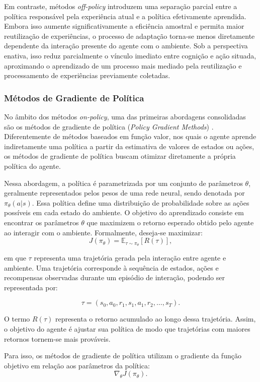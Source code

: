 Em contraste, métodos \textit{off-policy} introduzem uma separação parcial entre a política responsável pela experiência atual e a política efetivamente aprendida. Embora isso aumente significativamente a eficiência amostral e permita maior reutilização de experiências, o processo de adaptação torna-se menos diretamente dependente da interação presente do agente com o ambiente. Sob a perspectiva enativa, isso reduz parcialmente o vínculo imediato entre cognição e ação situada, aproximando o aprendizado de um processo mais mediado pela reutilização e processamento de experiências previamente coletadas.


\subsubsection{Métodos de Gradiente de Política}

No âmbito dos métodos \textit{on-policy}, uma das primeiras abordagens consolidadas são os métodos de gradiente de política (\textit{Policy Gradient Methods}) \cite{policygradient}. Diferentemente de métodos baseados em função valor, nos quais o agente aprende indiretamente uma política a partir da estimativa de valores de estados ou ações, os métodos de gradiente de política buscam otimizar diretamente a própria política do agente.

Nessa abordagem, a política é parametrizada por um conjunto de parâmetros $\theta$, geralmente representados pelos pesos de uma rede neural, sendo denotada por $\pi_\theta(a|s)$. Essa política define uma distribuição de probabilidade sobre as ações possíveis em cada estado do ambiente. O objetivo do aprendizado consiste em encontrar os parâmetros $\theta$ que maximizem o retorno esperado obtido pelo agente ao interagir com o ambiente. Formalmente, deseja-se maximizar:
$$
J(\pi_\theta) = \mathbb{E}_{\tau \sim \pi_\theta}[R(\tau)],
$$

em que $\tau$ representa uma trajetória gerada pela interação entre agente e ambiente. Uma trajetória corresponde à sequência de estados, ações e recompensas observadas durante um episódio de interação, podendo ser representada por:

$$
\tau = (s_0, a_0, r_1, s_1, a_1, r_2, \dots, s_T).
$$

O termo $R(\tau)$ representa o retorno acumulado ao longo dessa trajetória. Assim, o objetivo do agente é ajustar sua política de modo que trajetórias com maiores retornos tornem-se mais prováveis.

Para isso, os métodos de gradiente de política utilizam o gradiente da função objetivo em relação aos parâmetros da política:
$$
\nabla_\theta J(\pi_\theta).
$$

